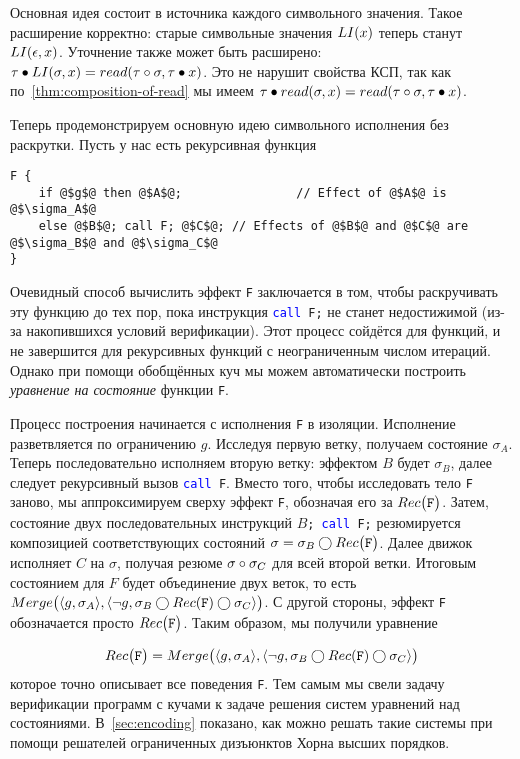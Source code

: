 %
Основная идея состоит в  источника каждого символьного значения. Такое расширение корректно: старые символьные значения $LI(x)$ теперь станут $LI(\epsilon, x)$. Уточнение также может быть расширено: $\tau\bullet LI(\sigma, x)=read(\tau\circ\sigma,\tau\bullet x)$. Это не нарушит свойства КСП, так как по~\autoref{thm:composition-of-read} мы имеем $\tau\bullet read(\sigma,x)=read(\tau\circ\sigma,\tau\bullet x)$.

Теперь продемонстрируем основную идею символьного исполнения без раскрутки. Пусть у нас есть рекурсивная функция
%
\begin{lstlisting}[style=demolang]
F {
	if @$g$@ then @$A$@;				// Effect of @$A$@ is @$\sigma_A$@
	else @$B$@; call F; @$C$@; // Effects of @$B$@ and @$C$@ are @$\sigma_B$@ and @$\sigma_C$@
}
\end{lstlisting}

Очевидный способ вычислить эффект \texttt{F} заключается в том, чтобы раскручивать эту функцию до тех пор, пока инструкция \texttt{\textcolor{blue}{call} F;} не станет недостижимой (из-за накопившихся условий верификации). Этот процесс сойдётся для  функций, и не завершится для рекурсивных функций с неограниченным числом итераций. Однако при помощи обобщённых куч мы можем автоматически построить \emph{уравнение на состояние} функции \texttt{F}.

Процесс построения начинается с исполнения \texttt{F} в изоляции. Исполнение разветвляется по ограничению $g$. Исследуя первую ветку, получаем состояние $\sigma_A$. Теперь последовательно исполняем вторую ветку: эффектом $B$ будет $\sigma_B$, далее следует рекурсивный вызов \texttt{\textcolor{blue}{call} F}. Вместо того, чтобы исследовать тело \texttt{F} заново, мы аппроксимируем сверху эффект \texttt{F}, обозначая его за $Rec\big(\texttt{F}\big)$. Затем, состояние двух последовательных инструкций \texttt{$B$; \textcolor{blue}{call} F;} резюмируется композицией соответствующих состояний $\sigma = \sigma_B\bigcirc Rec\big(\texttt{F}\big)$. Далее движок исполняет $C$ на $\sigma$, получая резюме $\sigma\circ\sigma_C$ для всей второй ветки. Итоговым состоянием для $F$ будет объединение двух веток, то есть $Merge\big(\langle g, \sigma_A\rangle, \langle\neg g, \sigma_B\bigcirc Rec(\texttt{F})\bigcirc\sigma_C\rangle\big)$. С другой стороны, эффект \texttt{F} обозначается просто $Rec\big(\texttt{F}\big)$. Таким образом, мы получили уравнение

\begin{align*}
Rec\big(\texttt{F}\big)=Merge\big(\langle g, \sigma_A\rangle, \langle\neg g, \sigma_B\bigcirc Rec(\texttt{F})\bigcirc\sigma_C\rangle\big)
\end{align*}
%
которое точно описывает все поведения \texttt{F}. Тем самым мы свели задачу верификации программ с кучами к задаче решения систем уравнений над состояниями. В~\autoref{sec:encoding} показано, как можно решать такие системы при помощи решателей ограниченных дизъюнктов Хорна высших порядков.

